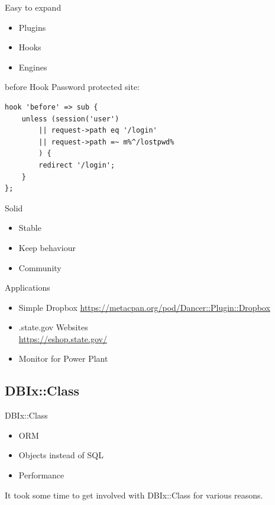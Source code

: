 \begin{frame}{Easy to expand}
\begin{itemize}
\item Plugins
\item Hooks
\item Engines
\end{itemize}
\end{frame}

\begin{frame}[fragile]{before Hook}
Password protected site:
\begin{lstlisting}
hook 'before' => sub {
    unless (session('user')
        || request->path eq '/login'
        || request->path =~ m%^/lostpwd%
        ) {
        redirect '/login';
    }
};
\end{lstlisting}
\end{frame}

\begin{frame}{Solid}
\begin{itemize}
\item Stable
\item Keep behaviour
\item Community
\end{itemize}
\end{frame}

\begin{frame}{Applications}
\begin{itemize}
\item Simple Dropbox 
\url{https://metacpan.org/pod/Dancer::Plugin::Dropbox}
\item .state.gov Websites \\
\url{https://eshop.state.gov/}
\item Monitor for Power Plant
\end{itemize}
\end{frame}

\subsection{DBIx::Class}
\begin{frame}{DBIx::Class}
\begin{itemize}
\item ORM
\item Objects instead of SQL
\item Performance
\end{itemize}
\end{frame}

It took some time to get involved with DBIx::Class for various reasons.

